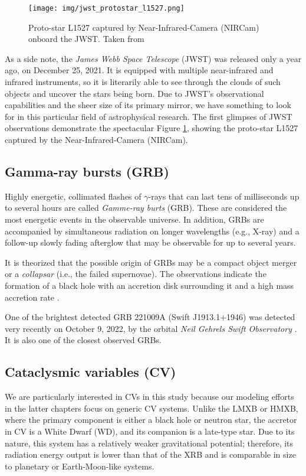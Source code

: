     \begin{figure}[h]
        \centering
        \texttt{[image: img/jwst\_protostar\_l1527.png]}
        \caption{Proto-star L1527 captured by Near-Infrared-Camera (NIRCam) onboard the JWST. Taken from \cite{nasa_img_l1527}}
        \label{fig:jwst_protostar_l1527}
    \end{figure}


    As a side note, the \emph{James Webb Space Telescope} (JWST) was released only a year ago, on December 25, 2021. It is equipped with multiple near-infrared and infrared instruments, so it is literarily able to see through the clouds of such objects and uncover the stars being born. Due to JWST's observational capabilities and the sheer size of its primary mirror, we have something to look for in this particular field of astrophysical research. The first glimpses of JWST observations demonstrate the spectacular Figure \ref{fig:jwst_protostar_l1527}, showing the proto-star L1527 captured by the Near-Infrared-Camera (NIRCam). 

\subsection{Gamma-ray bursts (GRB)}
    Highly energetic, collimated flashes of $\gamma$-rays that can last tens of milliseconds up to several hours are called \emph{Gamme-ray burts} (GRB). These are considered the most energetic events in the observable universe. In addition, GRBs are accompanied by simultaneous radiation on longer wavelengths (e.g., X-ray) and a follow-up slowly fading afterglow that may be observable for up to several years. 

    It is theorized that the possible origin of GRBs may be a compact object merger or a \emph{collapsar} (i.e., the failed supernovae). The observations indicate the formation of a black hole with an accretion disk surrounding it and a high mass accretion rate \cite{piran2005}.

    One of the brightest detected GRB 221009A (Swift J1913.1+1946) was detected very recently on October 9, 2022, by the orbital \emph{Neil Gehrels Swift Observatory} \cite{grb_221009a}. It is also one of the closest observed GRBs. 


\subsection{Cataclysmic variables (CV)}
    We are particularly interested in CVs in this study because our modeling efforts in the latter chapters focus on generic CV systems. Unlike the LMXB or HMXB, where the primary component is either a black hole or neutron star, the accretor in CV is a White Dwarf (WD), and its companion is a late-type star. Due to its nature, this system has a relatively weaker gravitational potential; therefore, its radiation energy output is lower than that of the XRB and is comparable in size to planetary or Earth-Moon-like systems. 

